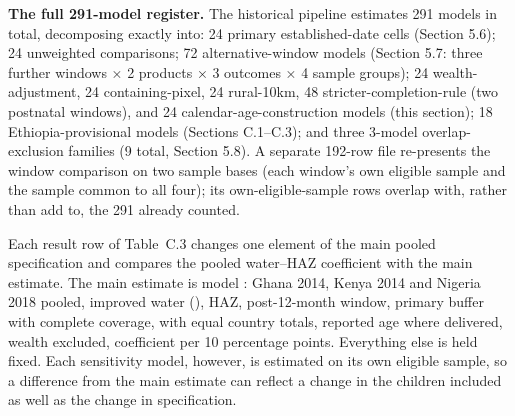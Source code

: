 \textbf{The full 291-model register.} The historical pipeline estimates 291 models in total, decomposing exactly into: 24 primary established-date cells (Section 5.6); 24 unweighted comparisons; 72 alternative-window models (Section 5.7: three further windows × 2 products × 3 outcomes × 4 sample groups); 24 wealth-adjustment, 24 containing-pixel, 24 rural-10km, 48 stricter-completion-rule (two postnatal windows), and 24 calendar-age-construction models (this section); 18 Ethiopia-provisional models (Sections C.1--C.3); and three 3-model overlap-exclusion families (9 total, Section 5.8). A separate 192-row file re-presents the window comparison on two sample bases (each window's own eligible sample and the sample common to all four); its own-eligible-sample rows overlap with, rather than add to, the 291 already counted.

Each result row of Table~C.3 changes one element of the main pooled specification and compares the pooled water--HAZ coefficient with the main estimate. The main estimate is model : Ghana 2014, Kenya 2014 and Nigeria 2018 pooled, improved water (), HAZ, post-12-month window, primary buffer with complete coverage,  with equal country totals, reported age where delivered, wealth excluded, coefficient per 10 percentage points. Everything else is held fixed. Each sensitivity model, however, is estimated on its own eligible sample, so a difference from the main estimate can reflect a change in the children included as well as the change in specification.


